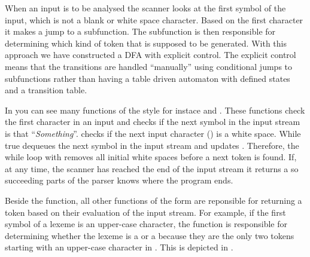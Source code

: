 When an input is to be analysed the scanner looks at the first symbol of the input, which is not a blank or white space character. Based on the first character it makes a jump to a subfunction. The subfunction is then responsible for determining which kind of token that is supposed to be generated. With this approach we have constructed a DFA with explicit control. The explicit control means that the transitions are handled ``manually'' using conditional jumps to subfunctions rather than having a table driven automaton with defined states and a transition table.

In  you can see many functions of the style  for instace  and . These functions check the first character in an input and checks if the next symbol in the input stream is that ``\textit{Something}''.  checks if the next input character () is a white space. While true  dequeues the next symbol in the input stream and updates . Therefore, the while loop with  removes all initial white spaces before a next token is found. If, at any time, the scanner has reached the end of the input stream it returns a  so succeeding parts of the parser knows where the program ends.

Beside the  function, all other functions of the form  are reponsible for returning a token based on their evaluation of the input stream.
For example, if the first symbol of a lexeme is an upper-case character, the function  is responsible for determining whether the lexeme is a  or a  because they are the only two tokens starting with an upper-case character in \productname{}. This is depicted in .


